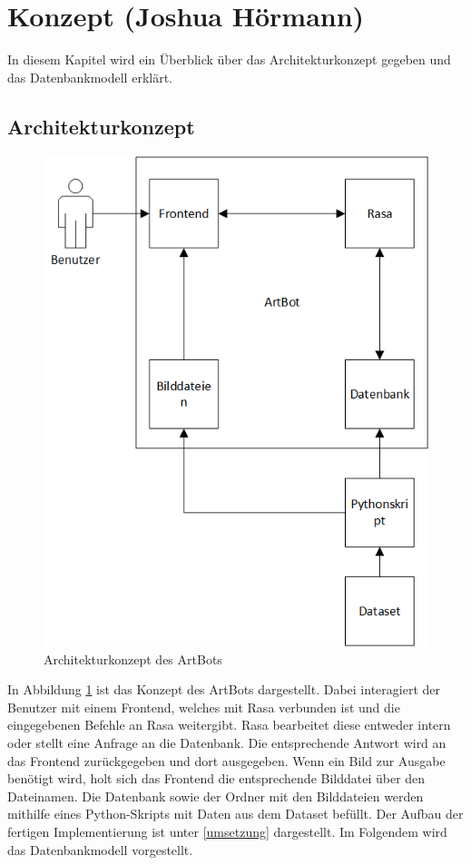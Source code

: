 \section{Konzept (Joshua Hörmann)}
In diesem Kapitel wird ein Überblick über das Architekturkonzept gegeben und das Datenbankmodell erklärt.
\subsection{Architekturkonzept}
\begin{figure}[H]
	\centerline{\includegraphics[width=0.6\linewidth]{figures/konzept.png}}
	\caption{Architekturkonzept des ArtBots}
	\label{konzept}
\end{figure}

In Abbildung \ref{konzept} ist das Konzept des ArtBots dargestellt. Dabei interagiert der Benutzer mit einem Frontend, welches mit Rasa verbunden ist und die eingegebenen Befehle an Rasa weitergibt. Rasa bearbeitet diese entweder intern oder stellt eine Anfrage an die Datenbank. Die entsprechende Antwort wird an das Frontend zurückgegeben und dort ausgegeben. Wenn ein Bild zur Ausgabe benötigt wird, holt sich das Frontend die entsprechende Bilddatei über den Dateinamen. Die Datenbank sowie der Ordner mit den Bilddateien werden mithilfe eines Python-Skripts mit Daten aus dem Dataset befüllt. Der Aufbau der fertigen Implementierung ist unter \ref{umsetzung} dargestellt. Im Folgendem wird das Datenbankmodell vorgestellt.


